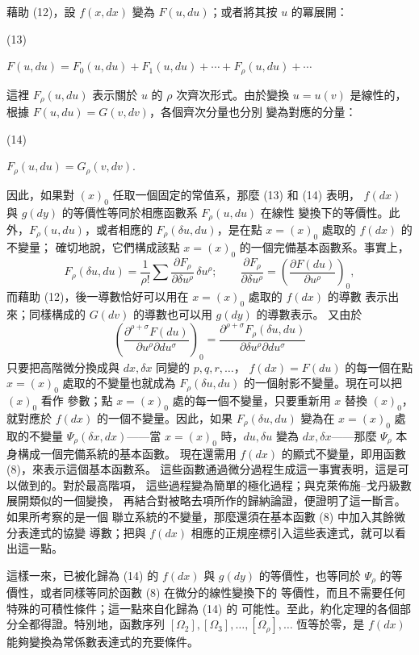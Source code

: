 \documentclass[11pt]{article}
\providecommand{\srcnumdisplay}[3][3.4em]{%
  \par\smallskip\noindent
  \begin{minipage}[t]{#1}\vspace*{0pt}#2\end{minipage}%
  \begin{minipage}[t]{\dimexpr\linewidth-#1\relax}\vspace*{0pt}\centering
  \(\displaystyle #3\)
  \end{minipage}\par\smallskip}
\begin{document}
藉助 (12)，設 \(f(x,dx)\) 變為 \(F(u,du)\)；或者將其按 \(u\) 的冪展開：
\srcnumdisplay{(13)}{%
F(u,du)=F_0(u,du)+F_1(u,du)+\cdots+F_\rho(u,du)+\cdots
}
這裡 \(F_\rho(u,du)\) 表示關於 \(u\) 的 \(\rho\) 次齊次形式。由於變換
\(u=u(v)\) 是線性的，根據 \(F(u,du)=G(v,dv)\)，各個齊次分量也分別
變為對應的分量：
\srcnumdisplay{(14)}{%
F_\rho(u,du)=G_\rho(v,dv).
}
因此，如果對 \((x)_0\) 任取一個固定的常值系，那麼 (13) 和 (14) 表明，
\(f(dx)\) 與 \(g(dy)\) 的等價性等同於相應函數系 \(F_\rho(u,du)\) 在線性
變換下的等價性。此外，\(F_\rho(u,du)\)，或者相應的
\(F_\rho(\delta u,du)\)，是在點 \(x=(x)_0\) 處取的 \(f(dx)\) 的不變量；
確切地說，它們構成該點 \(x=(x)_0\) 的一個完備基本函數系。事實上，
\[
F_\rho(\delta u,du)=\frac1{\rho!}\sum
\frac{\partial F_\rho}{\partial \delta u^\rho}\,\delta u^\rho;
\qquad
\frac{\partial F_\rho}{\partial \delta u^\rho}
=\left(\frac{\partial F(du)}{\partial u^\rho}\right)_0,
\]
而藉助 (12)，後一導數恰好可以用在 \(x=(x)_0\) 處取的 \(f(dx)\) 的導數
表示出來；同樣構成的 \(G(dv)\) 的導數也可以用 \(g(dy)\) 的導數表示。
又由於
\[
\left(\frac{\partial^{\rho+\sigma}F(du)}
{\partial u^\rho\partial du^\sigma}\right)_0
=
\frac{\partial^{\rho+\sigma}F_\rho(\delta u,du)}
{\partial\delta u^\rho\partial du^\sigma}
\]
只要把高階微分換成與 \(dx,\delta x\) 同變的 \(p,q,r,\ldots\)，
\(f(dx)=F(du)\) 的每一個在點 \(x=(x)_0\) 處取的不變量也就成為
\(F_\rho(\delta u,du)\) 的一個射影不變量。現在可以把 \((x)_0\) 看作
參數；點 \(x=(x)_0\) 處的每一個不變量，只要重新用 \(x\) 替換
\((x)_0\)，就對應於 \(f(dx)\) 的一個不變量。因此，如果
\(F_\rho(\delta u,du)\) 變為在 \(x=(x)_0\) 處取的不變量
\(\Psi_\rho(\delta x,dx)\)——當 \(x=(x)_0\) 時，\(du,\delta u\) 變為
\(dx,\delta x\)——那麼 \(\Psi_\rho\) 本身構成一個完備系統的基本函數。
現在還需用 \(f(dx)\) 的顯式不變量，即用函數 (8)，來表示這個基本函數系。
這些函數通過微分過程生成這一事實表明，這是可以做到的。對於最高階項，
這些過程變為簡單的極化過程；與克萊佈施--戈丹級數展開類似的一個變換，
再結合對被略去項所作的歸納論證，便證明了這一斷言。如果所考察的是一個
聯立系統的不變量，那麼還須在基本函數 (8) 中加入其餘微分表達式的協變
導數；把與 \(f(dx)\) 相應的正規座標引入這些表達式，就可以看出這一點。

這樣一來，已被化歸為 (14) 的 \(f(dx)\) 與 \(g(dy)\) 的等價性，也等同於
\(\Psi_\rho\) 的等價性，或者同樣等同於函數 (8) 在微分的線性變換下的
等價性，而且不需要任何特殊的可積性條件；這一點來自化歸為 (14) 的
可能性。至此，約化定理的各個部分全都得證。特別地，函數序列
\([\Omega_2],[\Omega_3],\ldots,[\Omega_\rho],\ldots\) 恆等於零，是
\(f(dx)\) 能夠變換為常係數表達式的充要條件。
\end{document}
